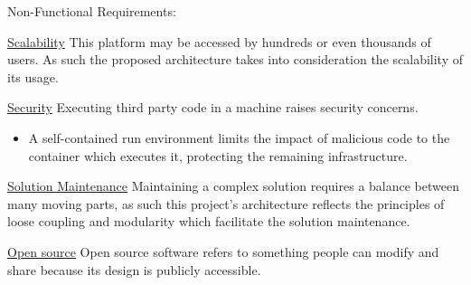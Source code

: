 \begin{flushleft}
Non-Functional Requirements:
\end{flushleft}

\begin{description}[font=$\bullet$~\normalfont\scshape\color{red!50!black}]
\item \underline{Scalability} This platform may be accessed by hundreds or even thousands of users. As such the proposed architecture takes into consideration the scalability of its usage.
         
\item \underline{Security} Executing third party code in a machine raises security concerns.
	\begin{itemize}
		\item 
		\iffalse		
		Executing the services which will execute this code in containers adresses some of these concerns.
		\fi 
		A self-contained run environment limits the impact of malicious code to the container which executes it, protecting the remaining infrastructure.
	\end{itemize}	   
              
\item \underline{Solution Maintenance}     
        Maintaining a complex solution requires a balance between many moving parts, as such this project's architecture reflects the principles of loose coupling and modularity which facilitate the solution maintenance.      

\iffalse
\item \underline{Efficiency}    
        Hosting the solution in a cloud based environment improves efficiency of the solution. 
\fi
\item \underline{Open source}     
        Open source software refers to something people can modify and share because its design is publicly accessible.

\end{description}